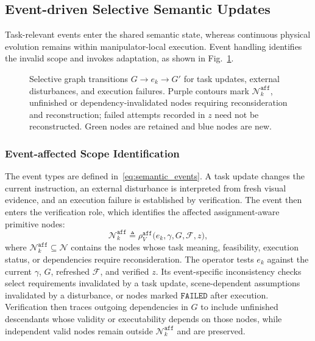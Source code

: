\subsection{Event-driven Selective Semantic Updates}
\label{sec:semantic_physical_coordination}

Task-relevant events enter the shared semantic state, whereas continuous
physical evolution remains within manipulator-local execution. Event handling
identifies the invalid scope and invokes adaptation, as shown in
Fig.~\ref{fig:event_graph_update}.

\begin{figure}[t!]
  \centering
  
  \caption{Selective graph transitions
  $G\rightarrow e_k\rightarrow G'$ for task updates, external
  disturbances, and execution failures. Purple contours mark
  $\mathcal{N}_k^{\texttt{aff}}$, unfinished or dependency-invalidated nodes
  requiring reconsideration and reconstruction; failed attempts recorded in
  $z$ need not be reconstructed. Green nodes are retained and blue nodes are new.}
  \label{fig:event_graph_update}
\end{figure}

\subsubsection{Event-affected Scope Identification}
\label{sec:affected_subtasks}

The event types are defined in~\eqref{eq:semantic_events}. A task update
changes the current instruction, an external disturbance is interpreted from
fresh visual evidence, and an execution failure is established by verification.
The event then enters the verification role, which identifies the affected
assignment-aware primitive nodes:
\begin{equation}
 \mathcal{N}_k^{\texttt{aff}}\triangleq
 \rho_V^{\texttt{aff}}\bigl(
 e_k,\gamma,G,\mathcal{F},z\bigr),
 \label{eq:affected_subtasks}
\end{equation}
where $\mathcal{N}_k^{\texttt{aff}}\subseteq\mathcal{N}$
contains the nodes whose task meaning, feasibility, execution status, or
dependencies require reconsideration. The operator tests $e_k$ against the
current $\gamma$, $G$, refreshed $\mathcal{F}$, and verified $z$. Its
event-specific inconsistency checks select requirements invalidated by a task
update, scene-dependent assumptions invalidated by a disturbance, or nodes
marked $\texttt{FAILED}$ after execution. Verification then traces outgoing
dependencies in $G$ to include unfinished descendants whose validity or
executability depends on those nodes, while independent valid nodes remain
outside $\mathcal{N}_k^{\texttt{aff}}$ and are preserved.

